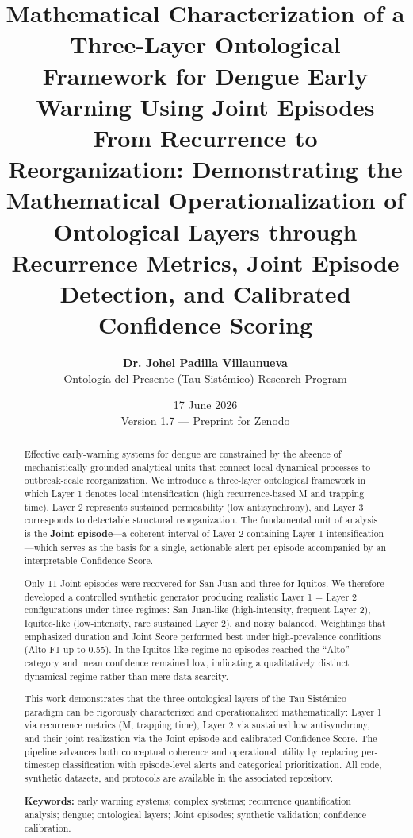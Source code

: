 \documentclass[11pt,a4paper]{article}
\title{\textbf{Mathematical Characterization of a Three-Layer Ontological Framework for Dengue Early Warning Using Joint Episodes}\\[0.35em]
\large From Recurrence to Reorganization: Demonstrating the Mathematical Operationalization of Ontological Layers through Recurrence Metrics, Joint Episode Detection, and Calibrated Confidence Scoring}
\author{
    \textbf{Dr. Johel Padilla Villaunueva} \\[0.25em]
    \small Ontolog\'ia del Presente (Tau Sist\'emico) Research Program
}
\date{17 June 2026 \\ \small Version 1.7 — Preprint for Zenodo}
\begin{document}
\maketitle

\begin{abstract}
\noindent Effective early-warning systems for dengue are constrained by the absence of mechanistically grounded analytical units that connect local dynamical processes to outbreak-scale reorganization. We introduce a three-layer ontological framework in which Layer 1 denotes local intensification (high recurrence-based M and trapping time), Layer 2 represents sustained permeability (low antisynchrony), and Layer 3 corresponds to detectable structural reorganization. The fundamental unit of analysis is the \textbf{Joint episode}—a coherent interval of Layer 2 containing Layer 1 intensification—which serves as the basis for a single, actionable alert per episode accompanied by an interpretable Confidence Score.

Only 11 Joint episodes were recovered for San Juan and three for Iquitos. We therefore developed a controlled synthetic generator producing realistic Layer 1 + Layer 2 configurations under three regimes: San Juan-like (high-intensity, frequent Layer 2), Iquitos-like (low-intensity, rare sustained Layer 2), and noisy balanced. Weightings that emphasized duration and Joint Score performed best under high-prevalence conditions (Alto F1 up to 0.55). In the Iquitos-like regime no episodes reached the ``Alto'' category and mean confidence remained low, indicating a qualitatively distinct dynamical regime rather than mere data scarcity.

This work demonstrates that the three ontological layers of the Tau Sistémico paradigm can be rigorously characterized and operationalized mathematically: Layer 1 via recurrence metrics (M, trapping time), Layer 2 via sustained low antisynchrony, and their joint realization via the Joint episode and calibrated Confidence Score. The pipeline advances both conceptual coherence and operational utility by replacing per-timestep classification with episode-level alerts and categorical prioritization. All code, synthetic datasets, and protocols are available in the associated repository.

\vspace{0.2em}
\noindent\textbf{Keywords:} early warning systems; complex systems; recurrence quantification analysis; dengue; ontological layers; Joint episodes; synthetic validation; confidence calibration.
\end{abstract}
\end{document}
